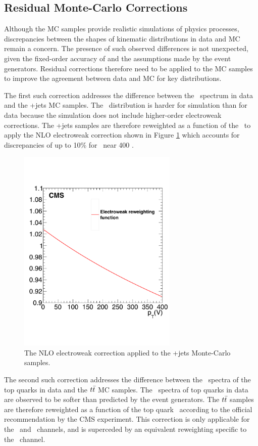 \subsection{Residual Monte-Carlo Corrections}

Although the MC samples provide realistic simulations of physics processes, discrepancies between the shapes of kinematic distributions in data and MC remain a concern. The presence of such observed differences is not unexpected, given the fixed-order accuracy of and the assumptions made by the event generators. Residual corrections therefore need to be applied to the MC samples to improve the agreement between data and MC for key distributions.

The first such correction addresses the difference between the \pTV\ spectrum in data and the \bosV+jets MC samples. The \pTV\ distribution is harder for simulation than for data because the simulation does not include higher-order electroweak corrections.\cite{EWKCORR} The \bosV+jets samples are therefore reweighted as a function of the \pTV\ to apply the NLO electroweak correction shown in Figure \ref{fig:vjetsewkweight} which accounts for discrepancies of up to 10\% for \pTV\ near 400 \GeV.

\begin{figure}[htbp]
  \centering
    \includegraphics[width=3in]{images/ewk_vjets_correction}
    \caption[2017 \bosV+jets MC Electroweak Correction]{The NLO electroweak correction applied to the \bosV+jets Monte-Carlo samples.}
    \label{fig:vjetsewkweight}
\end{figure}

The second such correction addresses the difference between the \pT\ spectra of the top quarks in data and the $t\bar{t}$ MC samples. The \pT\ spectra of top quarks in data are observed to be softer than predicted by the event generators. The $t\bar{t}$ samples are therefore reweighted as a function of the top quark \pT\ according to the official recommendation by the CMS experiment.\cite{CMSTTCORR} This correction is only applicable for the \ZnnH\ and \ZllH\ channels, and is superceded by an equivalent reweighting specific to the \WlnH\ channel. 

